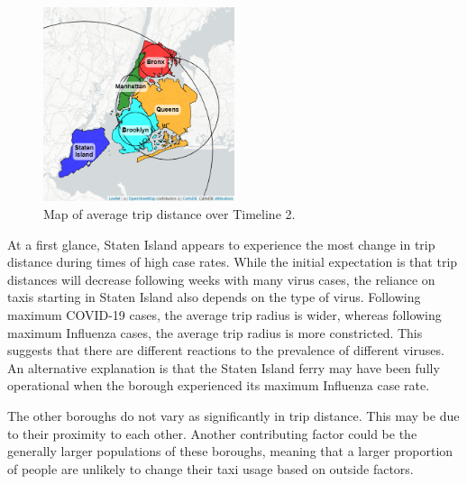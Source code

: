 \documentclass[11pt]{article}
\begin{document}
\begin{multicols}{2}
\begin{figure}[H]

    \centering

    \includegraphics[width=0.5\textwidth]{../plots/map-avg-trip-distance-overall-pu_borough-MODIFIED.png}

    \caption{Map of average trip distance over Timeline 2.} 
    \label{map:overall}
\end{figure}

At a first glance, Staten Island appears to experience the most change in trip distance during times of high case rates.
While the initial expectation is that trip distances will decrease following weeks with many virus cases,
the reliance on taxis starting in Staten Island also depends on the type of virus.
Following maximum COVID-19 cases, the average trip radius is wider, 
whereas following maximum Influenza cases, the average trip radius is more constricted.
This suggests that there are different reactions to the prevalence of different viruses.
An alternative explanation is that the Staten Island ferry may have been fully operational when the borough experienced its maximum Influenza case rate.

The other boroughs do not vary as significantly in trip distance.
This may be due to their proximity to each other.
Another contributing factor could be the generally larger populations of these boroughs,
meaning that a larger proportion of people are unlikely to change their taxi usage based on outside factors.


\end{multicols}

\end{document}
